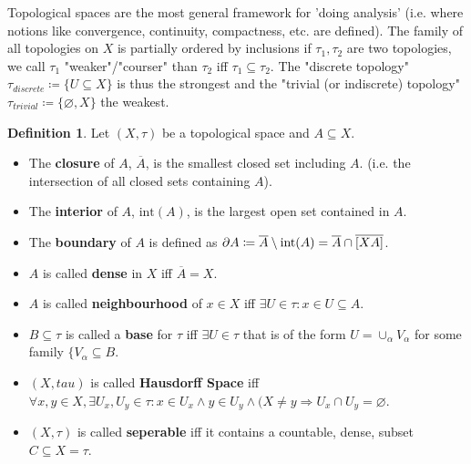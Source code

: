 \documentclass[10pt,a4paper]{article}
\theoremstyle{definition}
\newtheorem{definition}{Definition}
\theoremstyle{cor}
\theoremstyle{theorem}
\theoremstyle{lemma}
\theoremstyle{example}
\begin{document}
\noindent Topological spaces are the most general framework for 'doing analysis' (i.e. where notions like convergence, continuity, compactness, etc. are defined).  The family of all topologies on $X$ is partially ordered by inclusions if $\tau_1, \tau_2$ are two topologies, we call $\tau_1$ "weaker"/"courser" than $\tau_2$ iff $\tau_1 \subseteq \tau_2$. The "discrete topology" $\tau_{discrete} \coloneqq  \{U \subseteq X\}$ is thus the strongest and the "trivial (or indiscrete) topology" $\tau_{trivial}\coloneqq \{\varnothing, X\}$ the weakest.

\begin{definition}
Let $(X, \tau)$ be a topological space and $A \subseteq X$.
\begin{itemize}
\item The \textbf{closure} of $A$, $\overline{A}$, is the smallest closed set including $A$. (i.e. the intersection of all closed sets containing $A$).
\item The \textbf{interior} of $A$, $\text{int}(A)$, is the largest open set contained in $A$.
\item The \textbf{boundary} of $A$ is defined as $\partial A \coloneqq \overline{A} \setminus \text{int}(A) =  \overline{A} \cap \overline{[X\\A]}$.
\item $A$ is called \textbf{dense} in $X$ iff $\overline{A} = X$.
\item $A$ is called \textbf{neighbourhood} of $x\in X$ iff $\exists U \in \tau : x\in U \subseteq A$.
\item $B \subseteq \tau$ is called a \textbf{base} for $\tau$ iff $\exists U \in \tau$ that is of the form $U = \cup_{\alpha} V_{\alpha}$ for some family $\{ V_{\alpha} \subseteq B$.
\item $(X, tau)$ is called \textbf{Hausdorff Space} iff $\forall x, y \in X, \exists U_x, U_y \in \tau : x\in U_x \wedge y\in U_y \wedge (X \neq y \Rightarrow U_x \cap U_y = \varnothing$.
\item $(X, \tau)$ is called \textbf{seperable} iff it contains a countable, dense, subset $C \subseteq X = \tau$.
\end{itemize}
\end{definition}
\end{document}
